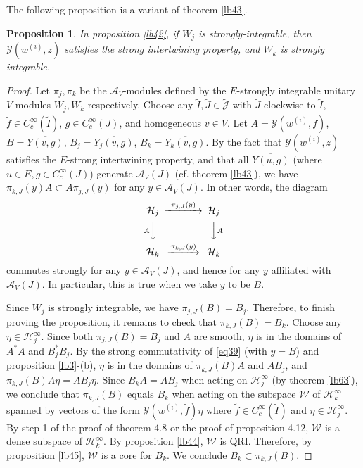\documentclass[12pt,a4paper]{article}
\theoremstyle{definition}
\theoremstyle{plain}
\newtheorem{pp}[df]{Proposition}
\newcommand{\mc}{\mathcal}
\newcommand{\wtd}{\widetilde}
\newcommand{\ovl}{\overline}
\newcommand{\Jtd}{\widetilde{\mathcal J}}
\numberwithin{equation}{subsection}
\begin{document}
The following proposition is a variant of theorem \ref{lb43}.

\begin{pp}\label{lb47}
In proposition \ref{lb42}, if $W_j$ is strongly-integrable, then $\mc Y(w^{(i)},z)$ satisfies the strong intertwining property, and $W_k$ is strongly integrable. 
\end{pp}
\begin{proof}
Let $\pi_j,\pi_k$ be the $\mc A_V$-modules defined by the $E$-strongly integrable unitary $V$-modules $W_j,W_k$ respectively. Choose any $\wtd I,\wtd J\in\Jtd$ with $\wtd J$ clockwise to $\wtd I$, $\wtd f\in C_c^\infty(\wtd I)$, $g\in C_c^\infty(J)$, and homogeneous $v\in V$.  Let $A=\ovl{\mc Y(w^{(i)},f)}$, $B=\ovl{Y(v,g)}$, $B_j=\ovl{Y_j(v,g)}$, $B_k=\ovl{Y_k(v,g)}$.  By the fact that $\mc Y(w^{(i)},z)$ satisfies the $E$-strong intertwining property, and  that all $\ovl{Y(u,g)}$ (where $u\in E,g\in C_c^\infty(J)$) generate $\mc A_V(J)$ (cf. theorem \ref{lb43}), we have $\pi_{k,J}(y)A\subset A\pi_{j,J}(y)$ for any $y\in\mc A_V(J)$. In other words, the diagram
\begin{align}\label{eq39}
\begin{CD}
\mc H_j @>~\pi_{j,J}(y)~>> \mc H_j\\
@V A  VV @VV  A V\\
\mc H_k @> \pi_{k,J}(y)>> \mc H_k
\end{CD}
\end{align}
commutes strongly for any $y\in\mc A_V(J)$, and hence for any $y$ affiliated with $\mc A_V(J)$. In particular, this is true when we take $y$ to be $B$. 

Since $W_j$ is strongly integrable, we have $\pi_{j,J}(B)=B_j$. Therefore, to finish proving the proposition, it remains to check that $\pi_{k,J}(B)=B_k$. Choose any $\eta\in\mc H_j^\infty$. Since both $\pi_{j,J}(B)=B_j$ and $A$ are smooth, $\eta$ is in the domains of $A^*A$ and $B_j^*B_j$. By the strong commutativity of \eqref{eq39} (with $y=B$) and proposition \ref{lb3}-(b), $\eta$ is in the domains of $\pi_{k,J}(B)A$ and $AB_j$, and $\pi_{k,J}(B)A\eta=AB_j\eta$. Since $B_kA=AB_j$ when acting on $\mc H_j^\infty$ (by theorem \ref{lb63}), we conclude that $\pi_{k,J}(B)$ equals $B_k$ when acting on the subspace $\mc W$ of $\mc H_k^\infty$ spanned by vectors of the form $\mc Y(w^{(i)},\wtd f)\eta$ where $\wtd f\in C_c^\infty(\wtd I)$ and $\eta\in\mc H_j^\infty$. By step 1 of the proof of \cite{Gui19b} theorem 4.8 or the proof of \cite{Gui21a} proposition 4.12, $\mc W$ is a dense subspace of $\mc H_k^\infty$. By proposition \ref{lb44}, $\mc W$ is QRI. Therefore, by proposition \ref{lb45}, $\mc W$ is a core for $B_k$. We conclude $B_k\subset\pi_{k,J}(B)$. 


\end{proof}
\end{document}
